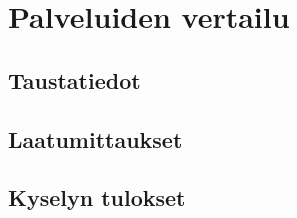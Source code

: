 \chapter{Palveluiden vertailu\label{vertailu}}

\section{Taustatiedot}
\section{Laatumittaukset}
\section{Kyselyn tulokset}
